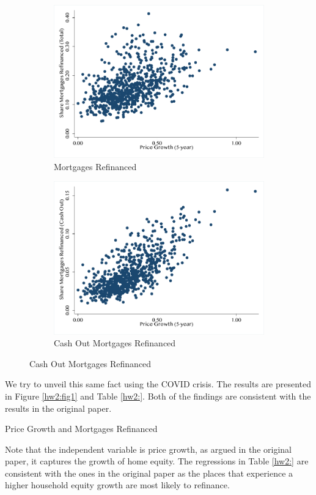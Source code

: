 \documentclass[11pt]{article}
\begin{document}
\begin{figure}[htb]
    \centering
    \caption{Price Growth and Mortgages Refinanced}
    \label{hw2:fig1}
    \begin{subfigure}[b]{0.45\textwidth}
            \includegraphics[width=\textwidth]{Figures/price_growth.pdf}
            \caption{Mortgages Refinanced}
        \end{subfigure}
        \begin{subfigure}[b]{0.45\textwidth}
            \includegraphics[width=\textwidth]{Figures/price_growth2.pdf}
            \caption{Cash Out Mortgages Refinanced}
        \end{subfigure}
\end{figure}
\FloatBarrier
We try to unveil this same fact using the COVID crisis. The results are presented in Figure \ref{hw2:fig1} and Table \ref{hw2:}. Both of the findings are consistent with the results in the original paper. 
\begin{table}[htb]
    \centering
    \caption{Price Growth and Mortgages Refinanced}
    \label{hw2:}
    \small{
    
    }
\end{table}
\FloatBarrier
Note that the independent variable is price growth, as argued in the original paper, it captures the growth of home equity. The regressions in Table \ref{hw2:} are consistent with the ones in the original paper as the places that experience a higher household equity growth are most likely to refinance. 
\end{document}
